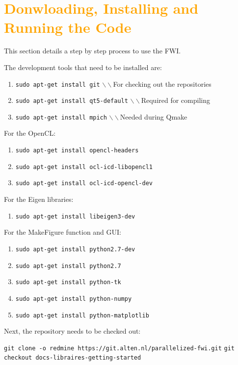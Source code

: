 \documentclass[10pt,a4paper]{article}
\begin{document}
\section{\textcolor{orange}{Donwloading, Installing and Running the Code}}

This section details a step by step process to use the FWI.


The development tools that need to be installed are:
\begin{enumerate}
    \item \texttt{sudo apt-get install git}  $\backslash\backslash$For
checking out the repositories
    \item \texttt{sudo apt-get install qt5-default}
$\backslash\backslash$Required for compiling
    \item \texttt{sudo apt-get install mpich}
$\backslash\backslash$Needed during Qmake
\end{enumerate}

For the OpenCL:
\begin{enumerate}
    \item \texttt{sudo apt-get install opencl-headers}
    \item \texttt{sudo apt-get install ocl-icd-libopencl1}
    \item \texttt{sudo apt-get install ocl-icd-opencl-dev}
\end{enumerate}

For the Eigen libraries:
\begin{enumerate}
    \item \texttt{sudo apt-get install libeigen3-dev}
\end{enumerate}


For the MakeFigure function and GUI:

\begin{enumerate}
    \item \texttt{sudo apt-get install python2.7-dev}
    \item \texttt{sudo apt-get install python2.7}
    \item \texttt{sudo apt-get install python-tk}
    \item \texttt{sudo apt-get install python-numpy}
    \item \texttt{sudo apt-get install python-matplotlib}
\end{enumerate}

Next, the repository needs to be checked out:
\newline

\texttt{git clone -o redmine https://git.alten.nl/parallelized-fwi.git}
\newline
\texttt{git checkout docs-libraires-getting-started}
\newline
\end{document}
